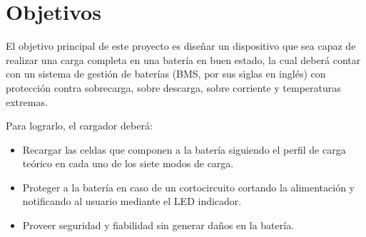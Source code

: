 \section*{Objetivos}

El objetivo principal de este proyecto es diseñar un dispositivo que sea capaz de realizar una carga completa en una batería en buen estado,
la cual deberá contar con un sistema de gestión de baterías (BMS, por sus siglas en inglés)
con protección contra sobrecarga, sobre descarga, sobre corriente y temperaturas extremas.

Para lograrlo, el cargador deberá:
\begin{itemize}
    \item Recargar las celdas que componen a la batería siguiendo el perfil de carga teórico en cada uno de los siete modos de carga.
    \item Proteger a la batería en caso de un cortocircuito cortando la alimentación y notificando al usuario mediante el LED indicador.
    \item Proveer seguridad y fiabilidad sin generar daños en la batería.
\end{itemize}